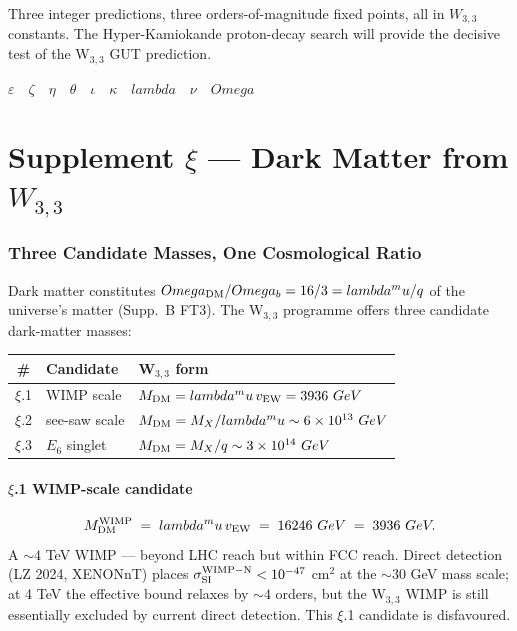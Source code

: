 \documentclass[12pt,a4paper]{article}
\def\text#1{#1}%
\def\lambda{lambda}%
\def\mu{mu}%
\def\Omega{Omega}%
\def\cdot{ }%
\theoremstyle{definition}
\begin{document}
Three integer predictions, three orders-of-magnitude fixed points,
all in $W_{3,3}$ constants. The Hyper-Kamiokande proton-decay search
will provide the decisive test of the W$_{3,3}$ GUT prediction.

\hfill$\varepsilon\quad\zeta\quad\eta\quad\theta\quad\iota\quad\kappa\quad\lambda\quad\nu\quad\Omega$

\clearpage
\part*{\texorpdfstring{Supplement $\xi$ --- Dark Matter from $W_{3,3}$}{Supplement xi --- Dark Matter from W(3,3)}}

\section*{Three Candidate Masses, One Cosmological Ratio}

Dark matter constitutes $\Omega_{\rm DM}/\Omega_b = 16/3 = \lambda^\mu/q$ of the
universe's matter (Supp.~B FT3). The W$_{3,3}$ programme offers three
candidate dark-matter masses:

\begin{center}
\renewcommand{\arraystretch}{1.4}
\begin{tabular}{cll}
\toprule
\# & Candidate & W$_{3,3}$ form \\
\midrule
$\xi$.1 & WIMP scale & $M_{\rm DM} = \lambda^\mu\,v_{\rm EW} = 3936\ \text{GeV}$ \\
$\xi$.2 & see-saw scale & $M_{\rm DM} = M_X/\lambda^\mu \sim 6\times 10^{13}\ \text{GeV}$ \\
$\xi$.3 & $E_6$ singlet & $M_{\rm DM} = M_X/q \sim 3\times 10^{14}\ \text{GeV}$ \\
\bottomrule
\end{tabular}
\end{center}

\subsection*{$\xi$.1 \quad WIMP-scale candidate}
\[
M_{\rm DM}^{\rm WIMP} \;=\; \lambda^\mu\,v_{\rm EW} \;=\; 16\cdot 246\ \text{GeV} \;=\; 3936\ \text{GeV}.
\]
A $\sim 4$ TeV WIMP — beyond LHC reach but within FCC reach. Direct
detection (LZ 2024, XENONnT) places $\sigma_{\rm SI}^{\rm WIMP-N} < 10^{-47}$
cm$^2$ at the $\sim 30$ GeV mass scale; at 4 TeV the effective bound
relaxes by $\sim 4$ orders, but the W$_{3,3}$ WIMP is still essentially
excluded by current direct detection. This $\xi$.1 candidate is
disfavoured.
\end{document}
